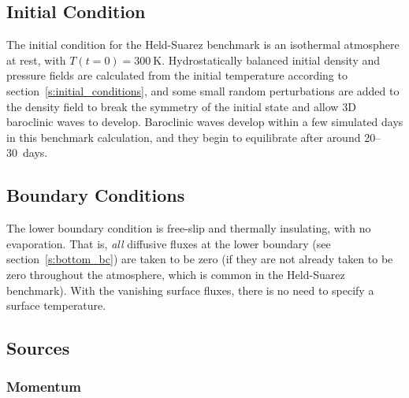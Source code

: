 \documentclass{report}
\begin{document}
\subsection{Initial Condition}

The initial condition for the Held-Suarez benchmark is an isothermal atmosphere at rest, with $T(t=0) = 300~\mathrm{K}$. Hydrostatically balanced initial density and pressure fields are calculated from the initial temperature according to section~\ref{s:initial_conditions}, and some small random perturbations are added to the density field to break the symmetry of the initial state and allow 3D baroclinic waves to develop. Baroclinic waves develop within a few simulated days in this benchmark calculation, and they begin to equilibrate after around 20--30~days. 

\subsection{Boundary Conditions}

The lower boundary condition is free-slip and thermally insulating, with no evaporation. That is, \emph{all} diffusive fluxes at the lower boundary (see section~\ref{s:bottom_bc}) are taken to be zero (if they are not already taken to be zero throughout the atmosphere, which is common in the Held-Suarez benchmark). With the vanishing surface fluxes, there is no need to specify a surface temperature.

\subsection{Sources}

\subsubsection{Momentum} 
\end{document}
